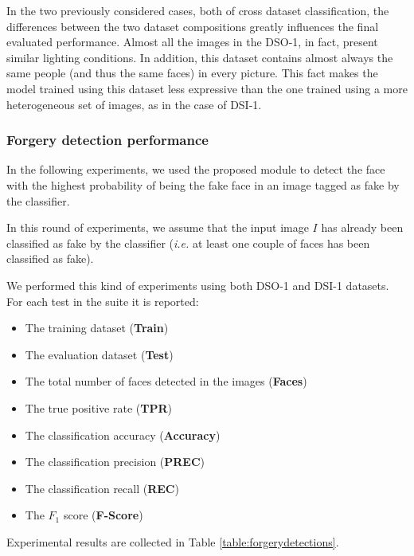 In the two previously considered cases, both of cross dataset classification, the differences between the two dataset compositions greatly influences the final evaluated performance. Almost all the images in the DSO-1, in fact, present similar lighting conditions. In addition, this dataset contains almost always the same people (and thus the same faces) in every picture. This fact makes the model trained using this dataset less expressive than the one trained using a more heterogeneous set of images, as in the case of DSI-1.

\subsubsection{Forgery detection performance}

In the following experiments, we used the proposed module to detect the face with the highest probability of being the fake face in an image tagged as fake by the classifier. 

In this round of experiments, we assume that the input image $I$ has already been classified as fake by the classifier (\emph{i.e.} at least one couple of faces has been classified as fake). 

We performed this kind of experiments using both DSO-1 and DSI-1 datasets. For each test in the suite it is reported:
\begin{itemize}
\item The training dataset (\textbf{Train})
\item The evaluation dataset (\textbf{Test})
\item The total number of faces detected in the images (\textbf{Faces})
\item The true positive rate (\textbf{TPR})
\item The classification accuracy (\textbf{Accuracy})
\item The classification precision (\textbf{PREC})
\item The classification recall (\textbf{REC})
\item The $F_1$ score (\textbf{F-Score})
\end{itemize}

Experimental results are collected in Table \ref{table:forgerydetections}.

